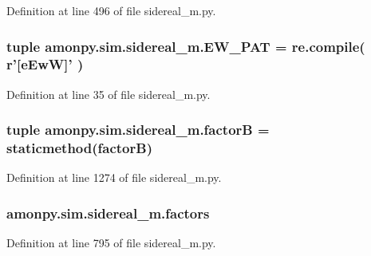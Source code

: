 Definition at line 496 of file sidereal\-\_\-m.\-py.

\hypertarget{namespaceamonpy_1_1sim_1_1sidereal__m_a8e77ac540138fcb3ae84bc714faeec6c}{
\subsubsection[{E\-W\-\_\-\-P\-A\-T}]{\setlength{\rightskip}{0pt plus 5cm}tuple amonpy.\-sim.\-sidereal\-\_\-m.\-E\-W\-\_\-\-P\-A\-T = re.\-compile( r'\mbox{[}e\-Ew\-W\mbox{]}' )}}\label{namespaceamonpy_1_1sim_1_1sidereal__m_a8e77ac540138fcb3ae84bc714faeec6c}


Definition at line 35 of file sidereal\-\_\-m.\-py.

\hypertarget{namespaceamonpy_1_1sim_1_1sidereal__m_a5d37cf446e5ecb640438e8248775c159}{
\subsubsection[{factor\-B}]{\setlength{\rightskip}{0pt plus 5cm}tuple amonpy.\-sim.\-sidereal\-\_\-m.\-factor\-B = staticmethod(factor\-B)}}\label{namespaceamonpy_1_1sim_1_1sidereal__m_a5d37cf446e5ecb640438e8248775c159}


Definition at line 1274 of file sidereal\-\_\-m.\-py.

\hypertarget{namespaceamonpy_1_1sim_1_1sidereal__m_aa5538735fe4f82de2a5c9fb7da460471}{
\subsubsection[{factors}]{\setlength{\rightskip}{0pt plus 5cm}amonpy.\-sim.\-sidereal\-\_\-m.\-factors}}\label{namespaceamonpy_1_1sim_1_1sidereal__m_aa5538735fe4f82de2a5c9fb7da460471}


Definition at line 795 of file sidereal\-\_\-m.\-py.

